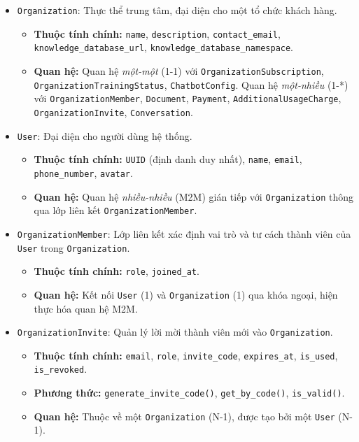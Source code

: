 \begin{itemize}[leftmargin=*, labelsep=4mm]
    \item \texttt{Organization}: Thực thể trung tâm, đại diện cho một tổ chức khách hàng.
        \begin{itemize}
            \item \textbf{Thuộc tính chính:} \texttt{name}, \texttt{description}, \texttt{contact\_email}, \texttt{knowledge\_database\_url}, \texttt{knowledge\_database\_namespace}.
            \item \textbf{Quan hệ:} Quan hệ \textit{một-một} (1-1) với \texttt{OrganizationSubscription}, \texttt{OrganizationTrainingStatus}, \texttt{ChatbotConfig}. Quan hệ \textit{một-nhiều} (1-*) với \texttt{OrganizationMember}, \texttt{Document}, \texttt{Payment}, \texttt{AdditionalUsageCharge}, \texttt{OrganizationInvite}, \texttt{Conversation}.
        \end{itemize}

    \item \texttt{User}: Đại diện cho người dùng hệ thống.
        \begin{itemize}
            \item \textbf{Thuộc tính chính:} \texttt{UUID} (định danh duy nhất), \texttt{name}, \texttt{email}, \texttt{phone\_number}, \texttt{avatar}.
            \item \textbf{Quan hệ:} Quan hệ \textit{nhiều-nhiều} (M2M) gián tiếp với \texttt{Organization} thông qua lớp liên kết \texttt{OrganizationMember}.
        \end{itemize}

    \item \texttt{OrganizationMember}: Lớp liên kết xác định vai trò và tư cách thành viên của \texttt{User} trong \texttt{Organization}.
        \begin{itemize}
            \item \textbf{Thuộc tính chính:} \texttt{role}, \texttt{joined\_at}.
            \item \textbf{Quan hệ:} Kết nối \texttt{User} (1) và \texttt{Organization} (1) qua khóa ngoại, hiện thực hóa quan hệ M2M.
        \end{itemize}

    \item \texttt{OrganizationInvite}: Quản lý lời mời thành viên mới vào \texttt{Organization}.
        \begin{itemize}
            \item \textbf{Thuộc tính chính:} \texttt{email}, \texttt{role}, \texttt{invite\_code}, \texttt{expires\_at}, \texttt{is\_used}, \texttt{is\_revoked}.
            \item \textbf{Phương thức:} \texttt{generate\_invite\_code()}, \texttt{get\_by\_code()}, \texttt{is\_valid()}.
            \item \textbf{Quan hệ:} Thuộc về một \texttt{Organization} (N-1), được tạo bởi một \texttt{User} (N-1).
        \end{itemize}


\end{itemize}
